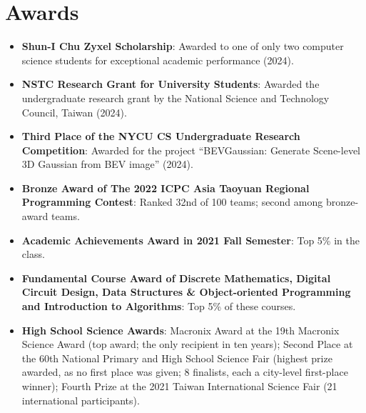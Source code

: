 \documentclass[a4paper,10pt]{extarticle}
\newenvironment{cvlist}
  {\begin{itemize}[leftmargin=1em, itemsep=2pt, topsep=0pt, parsep=0pt, label=\textbullet]}
  {\end{itemize}}
\newcommand{\cvitem}[2]{\item \textbf{#1}: #2}
\begin{document}
\section{Awards}
\begin{cvlist}
\cvitem{Shun-I Chu Zyxel Scholarship}{Awarded to one of only two computer science students for exceptional academic performance (2024).}
\cvitem{NSTC Research Grant for University Students}{Awarded the undergraduate research grant by the National Science and Technology Council, Taiwan (2024).}
\cvitem{Third Place of the NYCU CS Undergraduate Research Competition}{Awarded for the project ``BEVGaussian: Generate Scene-level 3D Gaussian from BEV image'' (2024).}
\cvitem{Bronze Award of The 2022 ICPC Asia Taoyuan Regional Programming Contest}{Ranked 32nd of 100 teams; second among bronze-award teams.}
\cvitem{Academic Achievements Award in 2021 Fall Semester}{Top 5\% in the class.}
\cvitem{Fundamental Course Award of Discrete Mathematics, Digital Circuit Design, Data Structures \& Object-oriented Programming and Introduction to Algorithms}{Top 5\% of these courses.}
\cvitem{High School Science Awards}{Macronix Award at the 19th Macronix Science Award (top award; the only recipient in ten years); Second Place at the 60th National Primary and High School Science Fair (highest prize awarded, as no first place was given; 8 finalists, each a city-level first-place winner); Fourth Prize at the 2021 Taiwan International Science Fair (21 international participants).}
\end{cvlist}

\end{document}
